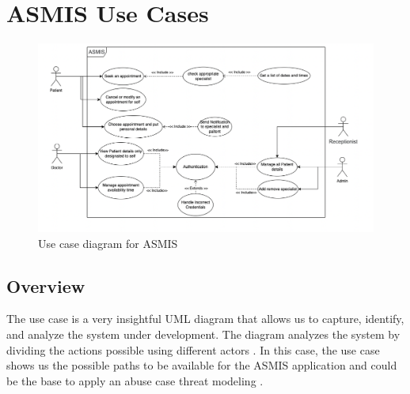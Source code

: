 \chapter{ASMIS Use Cases}

\begin{figure}[h!]
\centering
\includegraphics[width=\textwidth]{pics/usecase.png}
\caption{Use case diagram for ASMIS}\label{fig:usecase}
\end{figure}

\section{Overview}
The use case is a very insightful UML diagram that allows us to capture, identify, and analyze the system under development. The diagram analyzes the system by dividing the actions possible using different actors \citep[p.~64]{jacobson2021unified}. In this case, the use case shows us the possible paths to be available for the ASMIS application and could be the base to apply an abuse case threat modeling \citep [p.~59]{usecase_abuse_case}.


